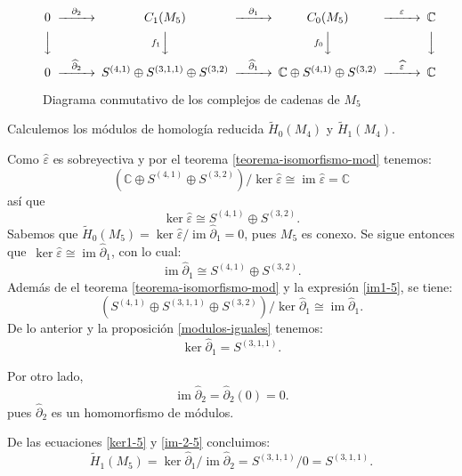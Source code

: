 \documentclass[12pt]{book}
\theoremstyle{definition}
\DeclareMathOperator{\im}{im}
\newcounter{in}
\begin{document}
\begin{figure}[h]
  \centering
    \[
    \begin{CD}
      0 @>{\partial_{2}}>> C_{1}(M_{5}) @>{\partial_{1}}>> C_{0}(M_{5}) @>{\varepsilon}>> \mathbb{C}\\
      @VVV   @Vf_{1} VV   @Vf_{0} VV   @VVV    \\
      0 @>{\widehat\partial_{2}}>> S^{(4,1)}\oplus S^{(3,1,1)}\oplus
      S^{(3,2)} @>{\widehat\partial_{1}}>> \mathbb{C}\oplus S^{(4,1)}
      \oplus S^{(3,2)} @>{\widehat \varepsilon}>> \mathbb{C}
    \end{CD}
    \]

    \caption{Diagrama conmutativo de los complejos de cadenas de
      $M_{5}$}
\label{fig:diagrama-conmutativo5}
\end{figure}

Calculemos los módulos de homología reducida $\widetilde H_{0}(M_{4})$ y
$\widetilde H_{1}(M_{4})$.

Como $\widehat\varepsilon$ es sobreyectiva y por el teorema \ref{teorema-isomorfismo-mod} tenemos:
$$(\mathbb{C}\oplus S^{(4,1)} \oplus
S^{(3,2)})/\ker\widehat\varepsilon\cong\im\widehat\varepsilon=\mathbb{C}$$
así que
\begin{equation*}
  \label{ker0-5}
  \ker\widehat\varepsilon\cong S^{(4,1)} \oplus S^{(3,2)}.
\end{equation*}
Sabemos que $\widetilde H_{0}(M_{5})=\ker \widehat\varepsilon/\im
\widehat\partial_{1}=0$, pues $M_{5}$  es
conexo. Se sigue entonces que~$\ker \widehat\varepsilon\cong
\im\widehat\partial_{1}$, con lo cual:
\begin{equation}
  \label{im1-5}
  \im \widehat\partial_{1}\cong S^{(4,1)} \oplus S^{(3,2)}.
\end{equation}
Además de el teorema \ref{teorema-isomorfismo-mod} y la expresión \ref{im1-5}, se tiene:
$$(S^{(4,1)}\oplus S^{(3,1,1)}\oplus S^{(3,2)})/\ker
\widehat\partial_{1}\cong \im \widehat\partial_{1}.$$
De lo anterior y la proposición \ref{modulos-iguales} tenemos:
\begin{equation}
  \label{ker1-5}
  \ker \widehat\partial_{1}= S^{(3,1,1)}.
\end{equation}

Por otro lado,
\begin{equation}
  \im\widehat\partial_{2}=\widehat\partial_{2}(0)=0.
  \label{im-2-5}
\end{equation}
pues $\widehat\partial_{2}$ es un homomorfismo de módulos.

De las ecuaciones \ref{ker1-5} y \ref{im-2-5} concluimos:
\begin{equation*}
  \widetilde H_{1}(M_{5})=\ker \widehat\partial_{1}/\im \widehat\partial_{2}=S^{(3,1,1)}/0=S^{(3,1,1)}.
\end{equation*}
 
\end{document}
